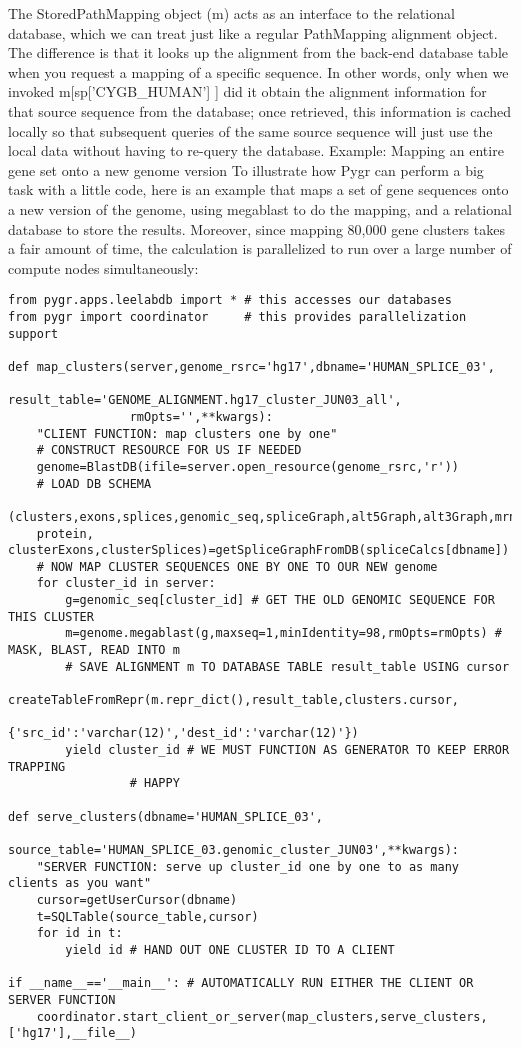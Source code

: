 \documentclass{howto}
\begin{document}
The StoredPathMapping object (m) acts as an interface to the relational database, which we can treat just like a regular PathMapping alignment object.  The difference is that it looks up the alignment from the back-end database table when you request a mapping of a specific sequence.  In other words, only when we invoked m[sp['CYGB_HUMAN'] ] did it obtain the alignment information for that source sequence from the database; once retrieved, this information is cached locally so that subsequent queries of the same source sequence will just use the local data without having to re-query the database.
Example: Mapping an entire gene set onto a new genome version
To illustrate how Pygr can perform a big task with a little code, here is an example that maps a set of gene sequences onto a new version of the genome, using megablast to do the mapping, and a relational database to store the results.  Moreover, since mapping 80,000 gene clusters takes a fair amount of time, the calculation is parallelized to run over a large number of compute nodes simultaneously:

\begin{verbatim}
from pygr.apps.leelabdb import * # this accesses our databases
from pygr import coordinator     # this provides parallelization support

def map_clusters(server,genome_rsrc='hg17',dbname='HUMAN_SPLICE_03',
                 result_table='GENOME_ALIGNMENT.hg17_cluster_JUN03_all',
                 rmOpts='',**kwargs):
    "CLIENT FUNCTION: map clusters one by one"
    # CONSTRUCT RESOURCE FOR US IF NEEDED
    genome=BlastDB(ifile=server.open_resource(genome_rsrc,'r'))
    # LOAD DB SCHEMA
    (clusters,exons,splices,genomic_seq,spliceGraph,alt5Graph,alt3Graph,mrna, 
    protein, clusterExons,clusterSplices)=getSpliceGraphFromDB(spliceCalcs[dbname])
    # NOW MAP CLUSTER SEQUENCES ONE BY ONE TO OUR NEW genome
    for cluster_id in server:
        g=genomic_seq[cluster_id] # GET THE OLD GENOMIC SEQUENCE FOR THIS CLUSTER
        m=genome.megablast(g,maxseq=1,minIdentity=98,rmOpts=rmOpts) # MASK, BLAST, READ INTO m
        # SAVE ALIGNMENT m TO DATABASE TABLE result_table USING cursor
        createTableFromRepr(m.repr_dict(),result_table,clusters.cursor,
                            {'src_id':'varchar(12)','dest_id':'varchar(12)'})
        yield cluster_id # WE MUST FUNCTION AS GENERATOR TO KEEP ERROR TRAPPING 
		         # HAPPY

def serve_clusters(dbname='HUMAN_SPLICE_03',
                   source_table='HUMAN_SPLICE_03.genomic_cluster_JUN03',**kwargs):
    "SERVER FUNCTION: serve up cluster_id one by one to as many clients as you want"
    cursor=getUserCursor(dbname)
    t=SQLTable(source_table,cursor)
    for id in t:
        yield id # HAND OUT ONE CLUSTER ID TO A CLIENT

if __name__=='__main__': # AUTOMATICALLY RUN EITHER THE CLIENT OR SERVER FUNCTION
    coordinator.start_client_or_server(map_clusters,serve_clusters,['hg17'],__file__)
\end{verbatim}
\end{document}
